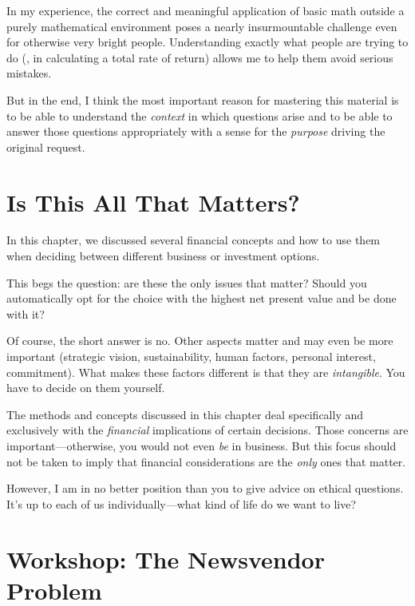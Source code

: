 In my experience, the correct and meaningful application of basic math
outside a purely mathematical environment poses a nearly
insurmountable challenge even for otherwise very bright people.
Understanding exactly what people are trying to do (\eg, in
calculating a total rate of return) allows me to help them avoid
serious mistakes.

But in the end, I think the most important reason for mastering this
material is to be able to understand the \emph{context} in which
questions arise and to be able to answer those questions
appropriately with a sense for the \emph{purpose} driving the original
request.

\vspace*{-9pt}
\section{Is This All That Matters?}

In this chapter, we discussed several financial concepts and how to use
them when deciding between different business or investment options.

This begs the question: are these the only issues that matter? Should
you automatically opt for the choice with the highest net present
value and be done with it?

Of course, the short answer is no. Other aspects matter and may even
be more important (strategic vision, sustainability, human factors,
personal interest, commitment). What makes these factors different is
that they are \emph{intangible}. You have to decide on them yourself.

The methods and concepts discussed in this chapter deal specifically
and exclusively with the \emph{financial} implications of certain
decisions. Those concerns are important---otherwise, you would not
even \emph{be} in business. But this focus should not be taken to
imply that financial considerations are the \emph{only} ones that
matter.\pagebreak

However, I am in no better position than you to give advice on ethical
questions. It's up to each of us individually---what kind of life do
we want to live?


\section{Workshop: The Newsvendor Problem}

